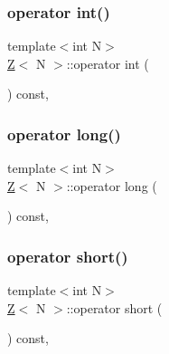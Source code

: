 \mbox{\label{classZ_af687c6f9e1dc94110596c3552351d257}} 
\subsubsection{\texorpdfstring{operator int()}{operator int()}}
{\footnotesize\ttfamily template$<$int N$>$ \\
\hyperlink{classZ}{Z}$<$ N $>$\+::operator int (\begin{DoxyParamCaption}{ }\end{DoxyParamCaption}) const\hspace{0.3cm}{\ttfamily [inline]}, {\ttfamily [explicit]}}

\mbox{\label{classZ_ab21d99c84819bcbc6de88489a5375be4}} 
\subsubsection{\texorpdfstring{operator long()}{operator long()}}
{\footnotesize\ttfamily template$<$int N$>$ \\
\hyperlink{classZ}{Z}$<$ N $>$\+::operator long (\begin{DoxyParamCaption}{ }\end{DoxyParamCaption}) const\hspace{0.3cm}{\ttfamily [inline]}, {\ttfamily [explicit]}}

\mbox{\label{classZ_ab40054217aadcaf96bc394e8593c0d69}} 
\subsubsection{\texorpdfstring{operator short()}{operator short()}}
{\footnotesize\ttfamily template$<$int N$>$ \\
\hyperlink{classZ}{Z}$<$ N $>$\+::operator short (\begin{DoxyParamCaption}{ }\end{DoxyParamCaption}) const\hspace{0.3cm}{\ttfamily [inline]}, {\ttfamily [explicit]}}

\mbox{\label{classZ_a91a2c48fff9d0b4b11e3e7da09c68b7b}} 
